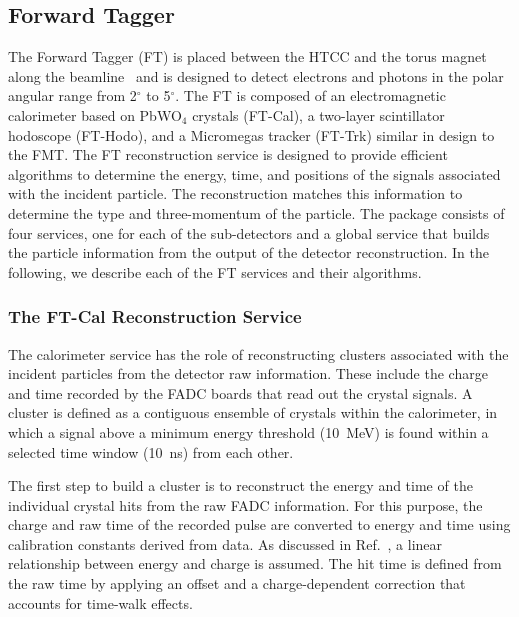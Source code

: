 \subsection{Forward Tagger}

The Forward Tagger (FT) is placed between the HTCC and the torus magnet along the beamline~\cite{ft-nim}
and is designed to detect electrons and photons in the polar angular range from 2$^\circ$ to 5$^\circ$. The
FT is composed of an electromagnetic calorimeter based on PbWO$_4$ crystals (FT-Cal), a two-layer scintillator
hodoscope (FT-Hodo), and a Micromegas tracker (FT-Trk) similar in design to the FMT. The FT reconstruction
service is designed to provide efficient algorithms to determine the energy, time, and positions of the signals
associated with the incident particle. The reconstruction matches this information to determine the type and
three-momentum of the particle. The package consists of four services, one for each of the sub-detectors and a
global service that builds the particle information from the output of the detector reconstruction. In the following,
we describe each of the FT services and their algorithms.

\subsubsection{The FT-Cal Reconstruction Service}

The calorimeter service has the role of reconstructing clusters associated with the incident particles from the
detector raw information. These include the charge and time recorded by the FADC boards that read out the
crystal signals. A cluster is defined as a contiguous ensemble of crystals within the calorimeter, in which a signal
above a minimum energy threshold (10~MeV) is found within a selected time window (10~ns) from each other.

The first step to build a cluster is to reconstruct the energy and time of the individual crystal hits from the raw
FADC information. For this purpose, the charge and raw time of the recorded pulse are converted to energy and
time using calibration constants derived from data. As discussed in Ref.~\cite{ft-nim}, a linear relationship between
energy and charge is assumed. The hit time is defined from the raw time by applying an offset and a charge-dependent
correction that accounts for time-walk effects.

